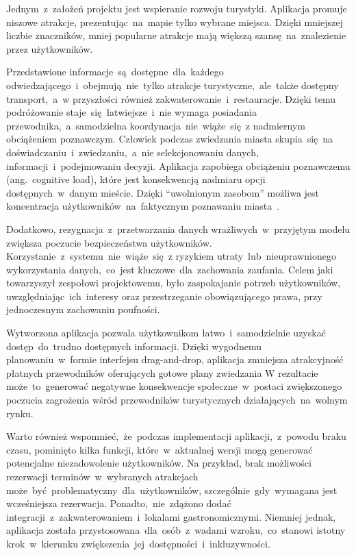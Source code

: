 \indent Jednym~z~założeń projektu jest wspieranie rozwoju turystyki.
Aplikacja promuje niszowe atrakcje, prezentując~na~mapie tylko wybrane miejsca.
Dzięki mniejszej liczbie znaczników, mniej popularne atrakcje mają większą szansę~na~znalezienie przez użytkowników.

\indent Przedstawione informacje~są~dostępne~dla~każdego odwiedzającego~i~obejmują~nie~tylko atrakcje turystyczne,~ale~także dostępny transport,~a~w przyszłości również zakwaterowanie~i~restauracje.
Dzięki temu podróżowanie staje~się~łatwiejsze~i~nie wymaga posiadania przewodnika,~a~samodzielna koordynacja~nie~wiąże~się~z nadmiernym obciążeniem poznawczym.
Człowiek podczas zwiedzania miasta skupia~się~na doświadczaniu~i~zwiedzaniu,~a~nie selekcjonowaniu danych, informacji~i~podejmowaniu decyzji.
Aplikacja zapobiega obciążeniu poznawczemu (ang.\ cognitive load), które jest konsekwencją nadmiaru opcji dostępnych~w~danym mieście.
Dzięki ``uwolnionym zasobom'' możliwa jest koncentracja użytkowników~na~faktycznym poznawaniu miasta~\cite{cognitive-biases}.

\indent Dodatkowo, rezygnacja~z~przetwarzania danych wrażliwych~w~przyjętym modelu zwiększa poczucie bezpieczeństwa użytkowników.
Korzystanie~z~systemu~nie~wiąże~się~z ryzykiem utraty~lub~nieuprawnionego wykorzystania danych,~co~jest kluczowe~dla~zachowania zaufania.
Celem jaki towarzyszył zespołowi projektowemu, było zaspokajanie potrzeb użytkowników, uwzględniając~ich~interesy oraz przestrzeganie obowiązującego prawa, przy jednoczesnym zachowaniu poufności.

\indent Wytworzona aplikacja pozwala użytkownikom łatwo~i~samodzielnie uzyskać dostęp~do~trudno dostępnych informacji.
Dzięki wygodnemu planowaniu~w~formie interfejsu drag-and-drop, aplikacja zmniejsza atrakcyjność płatnych przewodników oferujących gotowe plany zwiedzania
W rezultacie może~to~generować negatywne konsekwencje społeczne~w~postaci zwiększonego poczucia zagrożenia wśród przewodników turystycznych działających~na~wolnym rynku.

\indent Warto również wspomnieć,~że~podczas implementacji aplikacji,~z~powodu braku czasu, pominięto kilka funkcji, które~w~aktualnej wersji mogą generować potencjalne niezadowolenie użytkowników.
Na przykład, brak możliwości rezerwacji terminów~w~wybranych atrakcjach może~być~problematyczny~dla~użytkowników, szczególnie~gdy~wymagana jest wcześniejsza rezerwacja.
Ponadto,~nie~zdążono dodać integracji~z~zakwaterowaniem~i~lokalami gastronomicznymi.
Niemniej jednak, aplikacja została przystosowana~dla~osób~z~wadami wzroku,~co~stanowi istotny krok~w~kierunku zwiększenia~jej~dostępności~i~inkluzywności.

